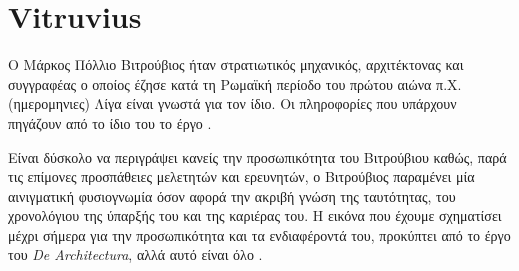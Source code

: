 
\section{Vitruvius}

Ο Μάρκος Πόλλιο Βιτρούβιος ήταν στρατιωτικός μηχανικός, αρχιτέκτονας και 
συγγραφέας ο οποίος έζησε κατά τη Ρωμαϊκή περίοδο του πρώτου αιώνα π.Χ. (ημερομηνιες) Λίγα είναι γνωστά για τον ίδιο. Οι πληροφορίες που 
υπάρχουν πηγάζουν από το ίδιο του το έργο \cite[σ.~390]{masterson_status_2004}.

Είναι δύσκολο να περιγράψει κανείς την προσωπικότητα του Βιτρούβιου καθώς, παρά 
τις επίμονες προσπάθειες μελετητών και ερευνητών, ο Βιτρούβιος παραμένει 
μία αινιγματική φυσιογνωμία όσον αφορά την ακριβή γνώση της ταυτότητας, του 
χρονολόγιου της ύπαρξής του και της καριέρας του. Η εικόνα που έχουμε 
σχηματίσει μέχρι σήμερα για την προσωπικότητα και τα ενδιαφέροντά του, 
προκύπτει από το έργο του \emph{De Architectura}, αλλά αυτό είναι όλο 
\cite{baldwin-1990}.  
